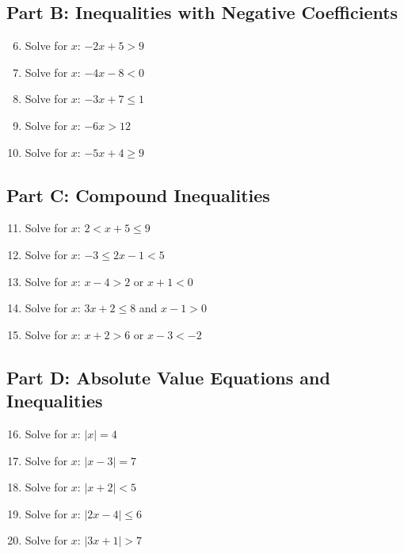 \documentclass[14pt]{extarticle}
\begin{document}
\subsection*{Part B: Inequalities with Negative Coefficients}
\begin{enumerate}
    \setcounter{enumi}{5}
    \item Solve for \(x\): \(-2x + 5 > 9\)
    \item Solve for \(x\): \(-4x - 8 < 0\)
    \item Solve for \(x\): \(-3x + 7 \le 1\)
    \item Solve for \(x\): \(-6x > 12\)
    \item Solve for \(x\): \(-5x + 4 \ge 9\)
\end{enumerate}

\subsection*{Part C: Compound Inequalities}
\begin{enumerate}
    \setcounter{enumi}{10}
    \item Solve for \(x\): \(2 < x + 5 \le 9\)
    \item Solve for \(x\): \(-3 \le 2x - 1 < 5\)
    \item Solve for \(x\): \(x - 4 > 2\) or \(x + 1 < 0\)
    \item Solve for \(x\): \(3x + 2 \le 8\) and \(x - 1 > 0\)
    \item Solve for \(x\): \(x + 2 > 6\) or \(x - 3 < -2\)
\end{enumerate}

\subsection*{Part D: Absolute Value Equations and Inequalities}
\begin{enumerate}
    \setcounter{enumi}{15}
    \item Solve for \(x\): \(|x| = 4\)
    \item Solve for \(x\): \(|x - 3| = 7\)
    \item Solve for \(x\): \(|x + 2| < 5\)
    \item Solve for \(x\): \(|2x - 4| \le 6\)
    \item Solve for \(x\): \(|3x + 1| > 7\)
\end{enumerate}
\end{document}
